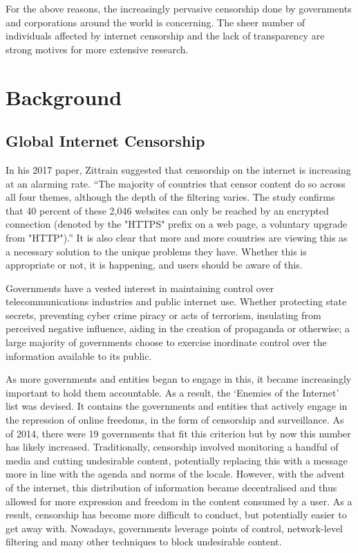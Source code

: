 For the above reasons, the increasingly pervasive censorship done by governments and corporations around the world is concerning. The sheer number of individuals affected by internet censorship and the lack of transparency are strong motives for more extensive research.

\section{Background}
\subsection{Global Internet Censorship}
In his 2017 paper, \cite{Zittrain2017Censorship} Zittrain suggested that censorship on the internet is increasing at an alarming rate. “The majority of countries that censor content do so across all four themes, although the depth of the filtering varies. The study confirms that 40 percent of these 2,046 websites can only be reached by an encrypted connection (denoted by the "HTTPS" prefix on a web page, a voluntary upgrade from "HTTP").” \cite{Zittrain2017Censorship} It is also clear that more and more countries are viewing this as a necessary solution to the unique problems they have. Whether this is appropriate or not, it is happening, and users should be aware of this. 

Governments have a vested interest in maintaining control over telecommunications industries and public internet use. Whether protecting state secrets, preventing cyber crime piracy or acts of terrorism, insulating from perceived negative influence, aiding in the creation of propaganda or otherwise; a large majority of governments choose to exercise inordinate control over the information available to its public.  

As more governments and entities began to engage in this, it became increasingly important to hold them accountable. As a result, the ‘Enemies of the Internet’ list was devised. It contains the governments and entities that actively engage in the repression of online freedoms, in the form of censorship and surveillance. As of 2014, there were 19 governments that fit this criterion but by now this number has likely increased. \cite{RSFEnemiesInternet2014} Traditionally, censorship involved monitoring a handful of media and cutting undesirable content, potentially replacing this with a message more in line with the agenda and norms of the locale. However, with the advent of the internet, this distribution of information became decentralised and thus allowed for more expression and freedom in the content consumed by a user. As a result, censorship has become more difficult to conduct, but potentially easier to get away with. Nowadays, governments leverage points of control, network-level filtering and many other techniques to block undesirable content.


